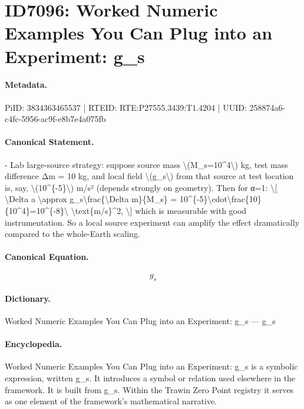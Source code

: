 \section*{ID7096: Worked Numeric Examples You Can Plug into an Experiment: g\_s}
\paragraph{Metadata.}
PiID: 3834363465537 | RTEID: RTE:P27555.3439:T1.4204 | UUID: 258874a6-c4fc-5956-ac9f-e8b7e4a075fb

\paragraph{Canonical Statement.}
- Lab large-source strategy: suppose source mass \textbackslash{}(M\_s=10\textasciicircum{}4\textbackslash{}) kg, test mass difference Δm = 10 kg, and local field \textbackslash{}(g\_s\textbackslash{}) from that source at test location is, say, \textbackslash{}(10\textasciicircum{}\{-5\}\textbackslash{}) m/s² (depends strongly on geometry). Then for α=1: \textbackslash{}[ \textbackslash{}Delta a \textbackslash{}approx g\_s\textbackslash{}frac\{\textbackslash{}Delta m\}\{M\_s\} = 10\textasciicircum{}\{-5\}\textbackslash{}cdot\textbackslash{}frac\{10\}\{10\textasciicircum{}4\}=10\textasciicircum{}\{-8\}\textbackslash{} \textbackslash{}text\{m/s\}\textasciicircum{}2, \textbackslash{}] which is measurable with good instrumentation. So a local source experiment can amplify the effect dramatically compared to the whole-Earth scaling.

\paragraph{Canonical Equation.}
\[
g_s
\]

\paragraph{Dictionary.}
Worked Numeric Examples You Can Plug into an Experiment: g\_s — g\_s

\paragraph{Encyclopedia.}
Worked Numeric Examples You Can Plug into an Experiment: g\_s is a symbolic expression, written g\_s. It introduces a symbol or relation used elsewhere in the framework. It is built from g\_s. Within the Trawin Zero Point registry it serves as one element of the framework's mathematical narrative.
